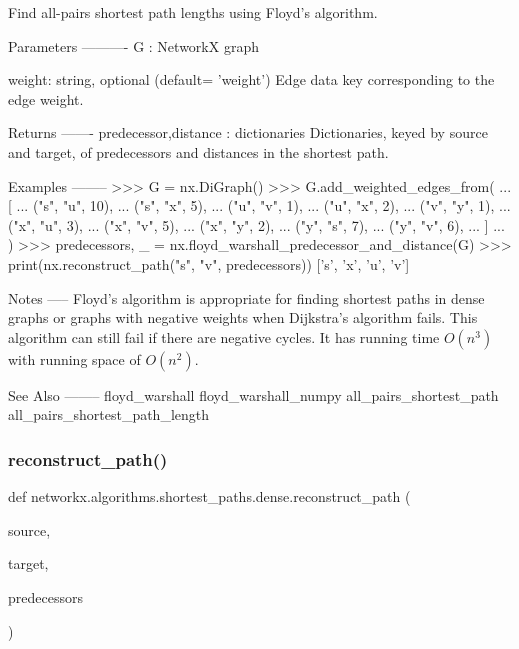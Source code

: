 \begin{DoxyVerb}Find all-pairs shortest path lengths using Floyd's algorithm.

Parameters
----------
G : NetworkX graph

weight: string, optional (default= 'weight')
   Edge data key corresponding to the edge weight.

Returns
-------
predecessor,distance : dictionaries
   Dictionaries, keyed by source and target, of predecessors and distances
   in the shortest path.

Examples
--------
>>> G = nx.DiGraph()
>>> G.add_weighted_edges_from(
...     [
...         ("s", "u", 10),
...         ("s", "x", 5),
...         ("u", "v", 1),
...         ("u", "x", 2),
...         ("v", "y", 1),
...         ("x", "u", 3),
...         ("x", "v", 5),
...         ("x", "y", 2),
...         ("y", "s", 7),
...         ("y", "v", 6),
...     ]
... )
>>> predecessors, _ = nx.floyd_warshall_predecessor_and_distance(G)
>>> print(nx.reconstruct_path("s", "v", predecessors))
['s', 'x', 'u', 'v']

Notes
-----
Floyd's algorithm is appropriate for finding shortest paths
in dense graphs or graphs with negative weights when Dijkstra's algorithm
fails.  This algorithm can still fail if there are negative cycles.
It has running time $O(n^3)$ with running space of $O(n^2)$.

See Also
--------
floyd_warshall
floyd_warshall_numpy
all_pairs_shortest_path
all_pairs_shortest_path_length
\end{DoxyVerb}
 \mbox{\label{namespacenetworkx_1_1algorithms_1_1shortest__paths_1_1dense_a1bba22b986bd6f786d0e44dc150339e9}} 
\subsubsection{\texorpdfstring{reconstruct\+\_\+path()}{reconstruct\_path()}}
{\footnotesize\ttfamily def networkx.\+algorithms.\+shortest\+\_\+paths.\+dense.\+reconstruct\+\_\+path (\begin{DoxyParamCaption}\item[{}]{source,  }\item[{}]{target,  }\item[{}]{predecessors }\end{DoxyParamCaption})}

